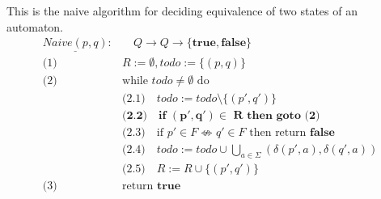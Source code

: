 \begin{definition}
  This is the naive algorithm for deciding equivalence of two states of an automaton.
  \begin{align*}
    \underline{\mathit{Naive(p, q)}}: &\quad Q \to Q \to \{\mathbf{true}, \mathbf{false}\} \\
    \text{(1) } & R := \emptyset, \mathit{todo} := \{(p, q)\} \\
    \text{(2) } & \text{while } \mathit{todo} \neq \emptyset \text{ do}\\
      & \text{(2.1)}\quad \mathit{todo} := \mathit{todo} \setminus \{(p', q')\}\\
      & \textbf{(2.2)}\quad \textbf{if } \mathbf{(p', q') \in} \textbf{ R} \textbf{ then goto (2)}\\
      & \text{(2.3)}\quad \text{if } p' \in F \nLeftrightarrow q' \in F \text{ then return } \mathbf{false}\\
      & \text{(2.4)}\quad \mathit{todo} := \mathit{todo} \cup \bigcup_{a \in \Sigma}{(\delta(p', a), \delta(q', a))}\\
      & \text{(2.5)}\quad R := R \cup \{(p', q')\} \\
    \text{(3) } & \text{return } \mathbf{true}\\
  \end{align*}
\end{definition}
